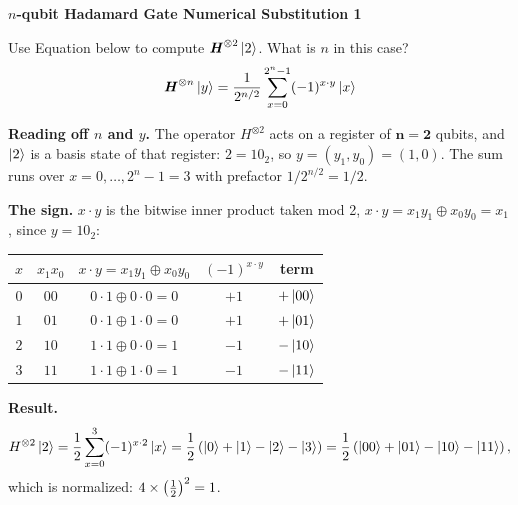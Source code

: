 \documentclass[a4paper, 10pt]{article}
\begin{document}
\newpage

\begin{problem}
\textbf{\( n \)-qubit Hadamard Gate Numerical Substitution 1}
\par Use Equation below to compute \( \textbf{\textit{H}}^{\otimes 2} \ket{2} \). What is \( n \) in this case?
\[  \textbf{\textit{H}}^{\otimes n} \ket{y} = \frac{1}{2^{n/2}} \sum_{x=0}^{2^n-1} (-1)^{x \cdot y} \ket{x} \]
\end{problem}

\begin{solution}
	\noindent \textbf{Reading off \( n \) and \( y \).} The operator \( H^{\otimes 2} \) acts on a register of \( \mathbf{n = 2} \) qubits, and \( \ket{2} \) is a basis state of that register: \( 2 = 10_2 \), so \( y = (y_1, y_0) = (1, 0) \).
	The sum runs over \( x = 0, \dots, 2^n - 1 = 3 \) with prefactor \( 1/2^{n/2} = 1/2 \).

	\noindent \textbf{The sign.} \( x \cdot y \) is the bitwise inner product taken mod 2, \( x \cdot y = x_1 y_1 \oplus x_0 y_0 = x_1 \), since \( y = 10_2 \):
	\begin{center}
		\begin{tabular}{ccccc}
			\toprule
			\( x \) & \( x_1 x_0 \) & \( x \cdot y = x_1 y_1 \oplus x_0 y_0 \) & \( (-1)^{x \cdot y} \) & term            \\
			\midrule
			\( 0 \) & \( 00 \)      & \( 0 \cdot 1 \oplus 0 \cdot 0 = 0 \)     & \( +1 \)               & \( +\ket{00} \) \\
			\( 1 \) & \( 01 \)      & \( 0 \cdot 1 \oplus 1 \cdot 0 = 0 \)     & \( +1 \)               & \( +\ket{01} \) \\
			\( 2 \) & \( 10 \)      & \( 1 \cdot 1 \oplus 0 \cdot 0 = 1 \)     & \( -1 \)               & \( -\ket{10} \) \\
			\( 3 \) & \( 11 \)      & \( 1 \cdot 1 \oplus 1 \cdot 0 = 1 \)     & \( -1 \)               & \( -\ket{11} \) \\
			\bottomrule
		\end{tabular}
	\end{center}

	\noindent \textbf{Result.}
	\[
		H^{\otimes 2}\ket{2}
		= \frac{1}{2}\sum_{x = 0}^{3} (-1)^{x \cdot 2}\ket{x}
		= \frac{1}{2}\left(\ket{0} + \ket{1} - \ket{2} - \ket{3}\right)
		= \frac{1}{2}\left(\ket{00} + \ket{01} - \ket{10} - \ket{11}\right),
	\]
	which is normalized: \( 4 \times \left(\tfrac{1}{2}\right)^2 = 1 \).
\end{solution}
\end{document}
